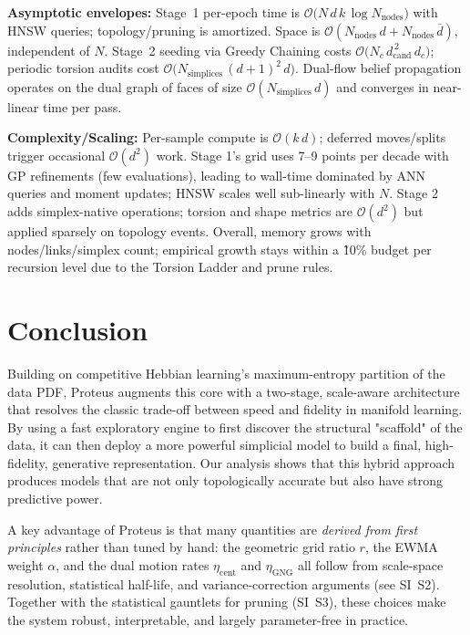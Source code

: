 \documentclass[11pt]{article}
\begin{document}
\noindent\textbf{Asymptotic envelopes:}
Stage~1 per-epoch time is $\mathcal O\bigl(N\,d\,k\,\log N_{\mathrm{nodes}}\bigr)$ with HNSW queries; topology/pruning is amortized. Space is $\mathcal O(N_{\mathrm{nodes}}\,d + N_{\mathrm{nodes}}\,\bar d)$, independent of $N$. Stage~2 seeding via Greedy Chaining costs $\mathcal O\bigl(N_c\,d_{\mathrm{cand}}^{\,2}\,d_c\bigr)$; periodic torsion audits cost $\mathcal O\bigl(N_{\mathrm{simplices}}\,(d{+}1)^2\,d\bigr)$. Dual-flow belief propagation operates on the dual graph of faces of size $\mathcal O(N_{\mathrm{simplices}}\,d)$ and converges in near-linear time per pass.

\textbf{Complexity/Scaling:} Per-sample compute is $\mathcal O(k\,d)$; deferred moves/splits trigger occasional $\mathcal O(d^2)$ work. Stage 1’s grid uses 7--9 points per decade with GP refinements (few evaluations), leading to wall-time dominated by ANN queries and moment updates; HNSW scales well sub-linearly with $N$. Stage 2 adds simplex-native operations; torsion and shape metrics are $\mathcal O(d^2)$ but applied sparsely on topology events. Overall, memory grows with nodes/links/simplex count; empirical growth stays within a \~10\% budget per recursion level due to the Torsion Ladder and prune rules.

\section{Conclusion}
Building on competitive Hebbian learning's maximum-entropy partition of the data PDF, Proteus augments this core with a two-stage, scale-aware architecture that resolves the classic trade-off between speed and fidelity in manifold learning. By using a fast exploratory engine to first discover the structural "scaffold" of the data, it can then deploy a more powerful simplicial model to build a final, high-fidelity, generative representation. Our analysis shows that this hybrid approach produces models that are not only topologically accurate but also have strong predictive power.

A key advantage of Proteus is that many quantities are \emph{derived from first principles} rather than tuned by hand: the geometric grid ratio $r$, the EWMA weight $\alpha$, and the dual motion rates $\eta_{\mathrm{cent}}$ and $\eta_{\mathrm{GNG}}$ all follow from scale-space resolution, statistical half-life, and variance-correction arguments (see SI~S2). Together with the statistical gauntlets for pruning (SI~S3), these choices make the system robust, interpretable, and largely parameter-free in practice.
\end{document}
